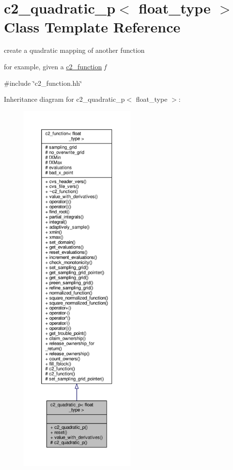 \hypertarget{classc2__quadratic__p}{}\section{c2\+\_\+quadratic\+\_\+p$<$ float\+\_\+type $>$ Class Template Reference}
\label{classc2__quadratic__p}


create a quadratic mapping of another function

for example, given a \hyperlink{classc2__function}{c2\+\_\+function} {\itshape f}  




{\ttfamily \#include \char`\"{}c2\+\_\+function.\+hh\char`\"{}}



Inheritance diagram for c2\+\_\+quadratic\+\_\+p$<$ float\+\_\+type $>$\+:
\nopagebreak
\begin{figure}[H]
\begin{center}
\leavevmode
\includegraphics[height=550pt]{classc2__quadratic__p__inherit__graph}
\end{center}
\end{figure}


